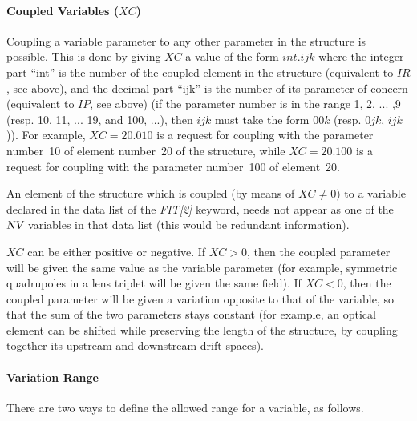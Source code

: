 \clearpage
             
\paragraph{Coupled Variables  ($XC$)   } 

\noindent  Coupling a variable parameter to any other parameter in the
structure is possible. This is done by giving $XC$ a value of the form $ int.ijk $ where
the integer part ``int'' is the number of the coupled element in the structure 
(equivalent to $ IR$, see above), and the decimal part ``ijk'' is the number of its 
parameter of concern (equivalent to $ IP$,  see above) (if the parameter
number is in the range 1, 2, ... ,9 (resp. 10, 11, ... 19, and 100, ...), then $ ijk $ 
must take the form $ 00k$ (resp. $0jk$, $ijk$)). For example, $ XC=20.010 $ is a request for coupling with the
parameter number~10 of element number~20 of the structure, while $ XC=20.100 $
is a request for coupling with the parameter number~100 of element~20.  

\bigskip

\noindent An element of the structure which is coupled (by means of $ XC\not= 0) $ to a 
variable declared in the data list of the \textsl{FIT[2]} keyword, needs not appear 
as one of the $ \textsl{NV} $ variables in that data list (this would be redundant information).  

\smallskip

\noindent $ XC $ can be either positive or negative. If $ XC>0$,  then the
coupled parameter will be given the same value as the variable parameter  
(for example, symmetric 
quadrupoles in a lens triplet will be given the same field). If $ XC<0$, 
then the coupled parameter will be given a variation opposite to that of the
variable, so that the sum of the two parameters stays constant (for example, an optical 
element can be shifted while preserving the length of the structure, by coupling 
together its upstream and downstream drift spaces).  

 
\paragraph{Variation Range  } 

\noindent There are two ways to define the allowed range for a variable, as follows. 

\medskip

